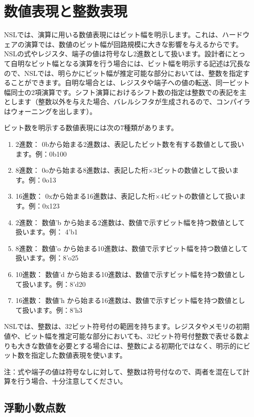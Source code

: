 \chapter{数値表現と整数表現}
\label{chap:expression}

NSLでは、演算に用いる数値表現にはビット幅を明示します。これは、ハードウェアの演算では、数値のビット幅が回路規模に大きな影響を与えるからです。NSLの式やレジスタ、端子の値は符号なし2進数として扱います。設計者にとって自明なビット幅となる演算を行う場合には、ビット幅を明示する記述は冗長なので、NSLでは、明らかにビット幅が推定可能な部分においては、整数を指定することができます。自明な場合とは、レジスタや端子への値の転送、同一ビット幅同士の2項演算です。シフト演算におけるシフト数の指定は整数での表記を主とします（整数以外を与えた場合、バレルシフタが生成されるので、コンパイラはウォーニングを出します）。

ビット数を明示する数値表現には次の7種類があります。

\begin{enumerate}
\item 2進数： 0bから始まる2進数は、表記したビット数を有する数値として扱います。例：0b100
\item 8進数： 0oから始まる8進数は、表記した桁×3ビットの数値として扱います。例：0o13
\item 16進数： 0xから始まる16進数は、表記した桁×4ビットの数値として扱います。例：0x123
\item 2進数： 数値'b から始まる2進数は、数値で示すビット幅を持つ数値として扱います。例： 4'b1
\item 8進数： 数値'o から始まる10進数は、数値で示すビット幅を持つ数値として扱います。例：8'o25
\item 10進数： 数値'd から始まる10進数は、数値で示すビット幅を持つ数値として扱います。例：8'd20
\item 16進数： 数値'h から始まる16進数は、数値で示すビット幅を持つ数値として扱います。例：8'h3
\end{enumerate}

NSLでは、整数は、32ビット符号付の範囲を持ちます。レジスタやメモリの初期値や、ビット幅を推定可能な部分においても、32ビット符号付整数で表せる数よりも大きな数値を必要とする場合には、整数による初期化ではなく、明示的にビット数を指定した数値表現を使います。

注：式や端子の値は符号なしに対して、整数は符号付なので、両者を混在して計算を行う場合、十分注意してください。

\section{浮動小数点数}

